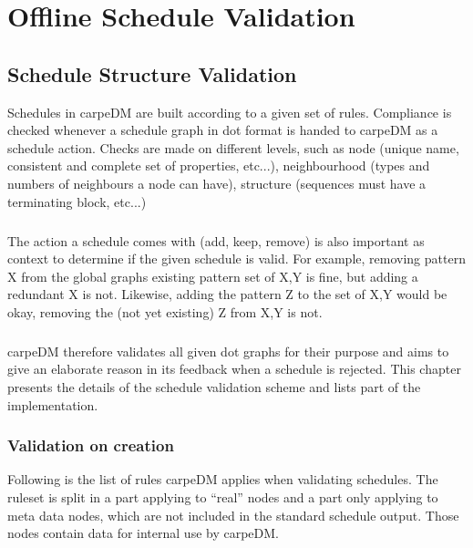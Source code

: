 \chapter{Offline Schedule Validation}

\section{Schedule Structure Validation}

Schedules in carpeDM are built according to a given set of rules. Compliance is checked whenever a schedule graph in dot format is handed to carpeDM as
a schedule action. Checks are made on different levels, such as node (unique name, consistent and complete set of properties, etc...), neighbourhood (types and numbers of neighbours a node can have),
structure (sequences must have a terminating block, etc...) 
\paragraph{}
The action a schedule comes with (add, keep, remove) is also important as context to determine if the given schedule is valid. For example, removing pattern X from the global graphs existing pattern set of X,Y is fine,
but adding a redundant X is not. Likewise, adding the pattern Z to the set of X,Y would be okay, removing the (not yet existing) Z from X,Y is not.
\paragraph{}
carpeDM therefore validates all given dot graphs for their purpose and aims to give an elaborate reason in its feedback when a schedule is rejected.
This chapter presents the details of the schedule validation scheme and lists part of the implementation.

\subsection{Validation on creation}

Following is the list of rules carpeDM applies when validating schedules. The ruleset is split in a part applying to \enquote{real} nodes and a part only applying to meta data nodes,
which are not included in the standard schedule output. Those nodes contain data for internal use by carpeDM.

